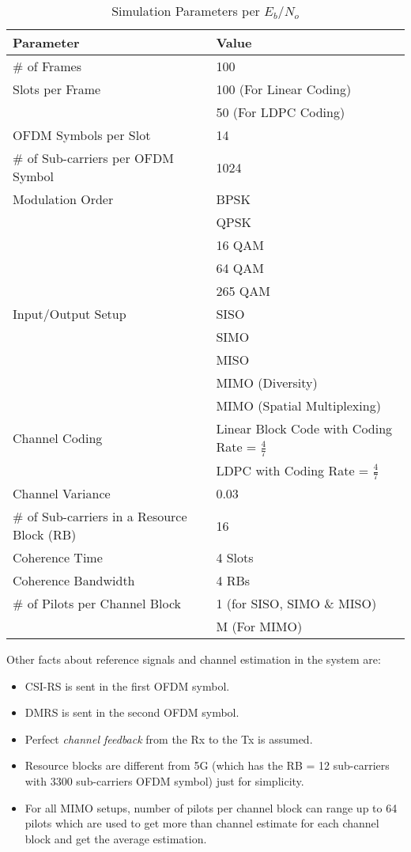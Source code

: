 \begin{table}[H]
    \centering
    \caption{Simulation Parameters per $E_b$/$N_o$}
    \label{tbl:ch parameters}
    \begin{tabular}{ll}
        \toprule
        Parameter & Value \\
        \midrule
        \# of Frames & 100 \\
        Slots per Frame & 100 (For Linear Coding) \\
                        & 50 (For LDPC Coding) \\
        OFDM Symbols per Slot & 14 \\
        \# of Sub-carriers per OFDM Symbol & 1024 \\
        Modulation Order & BPSK \\
                         & QPSK \\
                         & 16 QAM \\
                         & 64 QAM \\
                         & 265 QAM \\
        Input/Output Setup & SISO \\
                           & SIMO \\
                           & MISO \\
                           & MIMO (Diversity) \\
                           & MIMO (Spatial Multiplexing) \\
        Channel Coding & Linear Block Code with Coding Rate = $\frac{4}{7}$ \\
                       & LDPC with Coding Rate = $\frac{4}{7}$ \\
        Channel Variance & 0.03 \\
        \# of Sub-carriers in a Resource Block (RB) & 16 \\
        Coherence Time & 4 Slots \\
        Coherence Bandwidth & 4 RBs \\ 
        \# of Pilots per Channel Block & 1 (for SISO, SIMO \& MISO) \\
        & M (For MIMO) \\
        \bottomrule
    \end{tabular}
\end{table}

Other facts about reference signals and channel estimation in the system are:
\begin{itemize}
    \item CSI-RS is sent in the first OFDM symbol.
    \item DMRS is sent in the second OFDM symbol.
    \item Perfect \emph{channel feedback} from the Rx to the Tx is assumed.
    \item Resource blocks are different from 5G (which has the RB = 12 sub-carriers with 3300 sub-carriers OFDM symbol) just for simplicity.
    \item For all MIMO setups, number of pilots per channel block can range up to 64 pilots which are used to get more than channel estimate for each channel block and get the average estimation.
\end{itemize}

